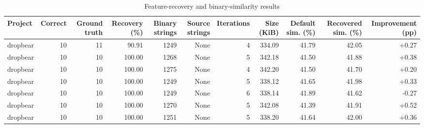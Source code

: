 \begin{table}[htbp]
\centering
\caption{Feature-recovery and binary-similarity results}
\label{tab:feature-recovery-results}
\small
\begin{tabular}{lrrrrrrrrrr}
\toprule
Project & Correct & Ground truth & Recovery (\%) & Binary strings & Source strings & Iterations & Size (KiB) & Default sim. (\%) & Recovered sim. (\%) & Improvement (pp) \\
\midrule
dropbear & 10 & 11 & 90.91 & 1249 & None & 4 & 334.09 & 41.79 & 42.05 & +0.27 \\
dropbear & 10 & 10 & 100.00 & 1268 & None & 5 & 342.18 & 41.50 & 41.88 & +0.38 \\
dropbear & 10 & 10 & 100.00 & 1275 & None & 4 & 342.20 & 41.50 & 41.70 & +0.20 \\
dropbear & 10 & 10 & 100.00 & 1249 & None & 5 & 338.12 & 41.65 & 41.98 & +0.33 \\
dropbear & 10 & 10 & 100.00 & 1249 & None & 6 & 338.14 & 41.89 & 41.62 & -0.27 \\
dropbear & 10 & 10 & 100.00 & 1270 & None & 5 & 342.08 & 41.39 & 41.91 & +0.52 \\
dropbear & 10 & 10 & 100.00 & 1251 & None & 5 & 338.20 & 41.64 & 42.00 & +0.36 \\
\bottomrule
\end{tabular}
\end{table}
